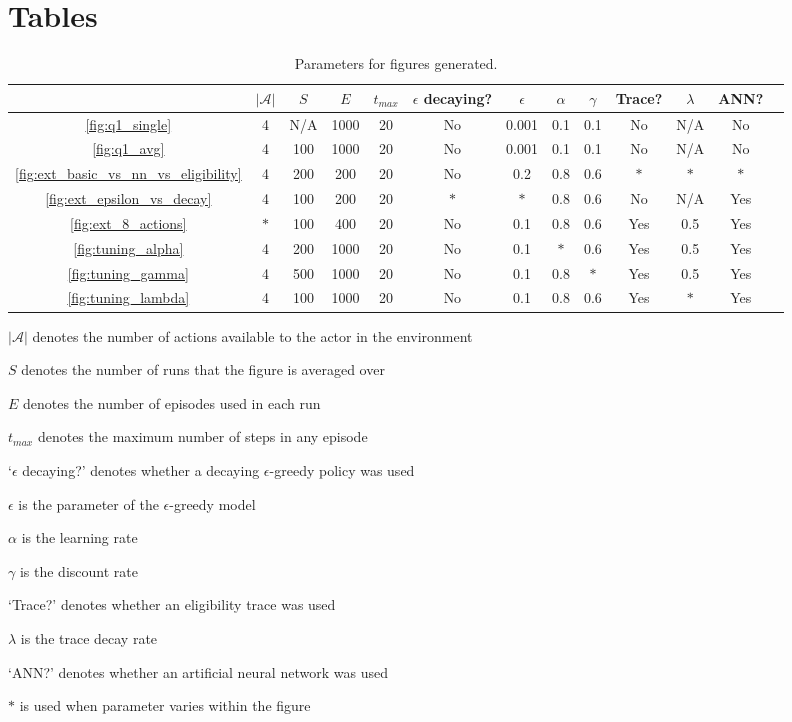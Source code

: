 \documentclass[a4paper, 11pt, twocolumn, final]{article} %
\begin{document}
\section{Tables}
\begin{table}[H]
  \centering
  \begin{tabular}{c | c c c c c c c c c c c c}
    \hline
    & $|\mathcal{A}|$ & $S$ & $E$ & $t_{max}$ & $\epsilon$ decaying? &
      $\epsilon$ & $\alpha$ & $\gamma$ & Trace? & $\lambda$ & ANN? \\
    \hline
    \autoref{fig:q1_single} & 4 & N/A & 1000 & 20 & No & 0.001 & 0.1 & 0.1 &
      No & N/A & No \\
    \autoref{fig:q1_avg} & 4 & 100 & 1000 & 20 & No & 0.001 & 0.1 & 0.1 & No &
      N/A & No \\
    \autoref{fig:ext_basic_vs_nn_vs_eligibility} & 4 & 200 & 200 & 20 & No &
      0.2 & 0.8 & 0.6 & $*$ & $*$ & $*$ \\
    \autoref{fig:ext_epsilon_vs_decay} & 4 & 100 & 200 & 20 & $*$ & $*$ & 0.8 &
      0.6 & No & N/A & Yes \\
    \autoref{fig:ext_8_actions} & $*$ & 100 & 400 & 20 & No & 0.1 & 0.8 & 0.6
      & Yes & 0.5 & Yes \\
    \autoref{fig:tuning_alpha} & 4 & 200 & 1000 & 20 & No & 0.1 & $*$ & 0.6 &
      Yes & 0.5 & Yes \\
    \autoref{fig:tuning_gamma} & 4 & 500 & 1000 & 20 & No & 0.1 & 0.8 & $*$ &
      Yes & 0.5 & Yes \\
    \autoref{fig:tuning_lambda} & 4 & 100 & 1000 & 20 & No & 0.1 & 0.8 & 0.6 &
      Yes & $*$ & Yes \\
    \hline
  \end{tabular}
  \caption{Parameters for figures generated.}
  \label{tab:parameters}
\end{table}

\begin{itemize*}
  \item $|\mathcal{A}|$ denotes the number of actions available to the actor in
    the environment
  \item $S$ denotes the number of runs that the figure is averaged over
  \item $E$ denotes the number of episodes used in each run
  \item $t_{max}$ denotes the maximum number of steps in any episode
  \item `$\epsilon$ decaying?' denotes whether a decaying $\epsilon$-greedy
    policy was used
  \item $\epsilon$ is the parameter of the $\epsilon$-greedy model
  \item $\alpha$ is the learning rate
  \item $\gamma$ is the discount rate
  \item `Trace?' denotes whether an eligibility trace was used
  \item $\lambda$ is the trace decay rate
  \item `ANN?' denotes whether an artificial neural network was used
  \item $*$ is used when parameter varies within the figure
\end{itemize*}
\end{document}
